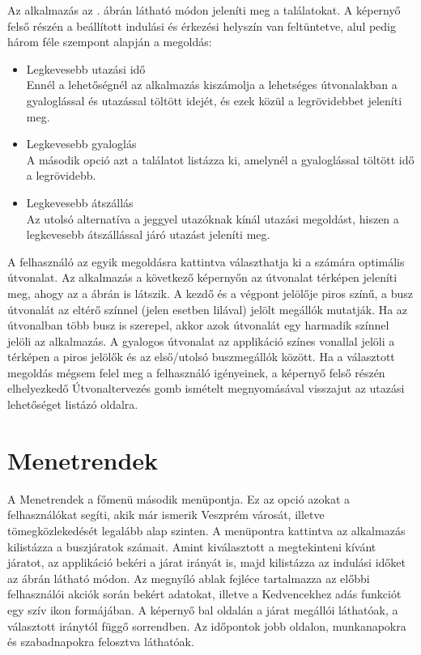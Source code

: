 Az alkalmazás az . ábrán látható módon jeleníti meg a találatokat.
A képernyő felső részén a beállított indulási és érkezési helyszín van feltüntetve, alul pedig három féle szempont alapján a megoldás:
\begin{itemize}
	\item Legkevesebb utazási idő
	\\Ennél a lehetőségnél az alkalmazás kiszámolja a lehetséges útvonalakban a gyaloglással és utazással töltött idejét, és ezek közül a legrövidebbet jeleníti meg.
	\item Legkevesebb gyaloglás
	\\A második opció azt a találatot listázza ki, amelynél a gyaloglással töltött idő a legrövidebb.
	\item Legkevesebb átszállás
	\\Az utolsó alternatíva a jeggyel utazóknak kínál utazási megoldást, hiszen a legkevesebb átszállással járó utazást jeleníti meg.
\end{itemize}
A felhasználó az egyik megoldásra kattintva választhatja ki a számára optimális útvonalat.
Az alkalmazás a következő képernyőn az útvonalat térképen jeleníti meg, ahogy az a   ábrán is látszik.
A kezdő és a végpont jelölője piros színű, a busz útvonalát az eltérő színnel (jelen esetben lilával) jelölt megállók mutatják.
Ha az útvonalban több busz is szerepel, akkor azok útvonalát egy harmadik színnel jelöli az alkalmazás.
A gyalogos útvonalat az applikáció színes vonallal jelöli a térképen a piros jelölők és az első/utolsó buszmegállók között.
Ha a választott megoldás mégsem felel meg a felhasználó igényeinek, a képernyő felső részén elhelyezkedő Útvonaltervezés gomb ismételt megnyomásával visszajut az utazási lehetőséget listázó oldalra.
\section {Menetrendek}
\label {menetrendek}
A Menetrendek a főmenü második menüpontja.
Ez az opció azokat a felhasználókat segíti, akik már ismerik Veszprém városát, illetve tömegközlekedését legalább alap szinten.
A menüpontra kattintva az alkalmazás kilistázza a buszjáratok számait.
Amint kiválasztott a megtekinteni kívánt járatot, az applikáció bekéri a járat irányát is, majd kilistázza az indulási időket az  ábrán látható módon.
Az megnyíló ablak fejléce tartalmazza az előbbi felhasználói akciók során bekért adatokat, illetve a Kedvencekhez adás funkciót egy szív ikon formájában.
A képernyő bal oldalán a járat megállói láthatóak, a választott iránytól függő sorrendben.
Az időpontok jobb oldalon, munkanapokra és szabadnapokra felosztva láthatóak.

